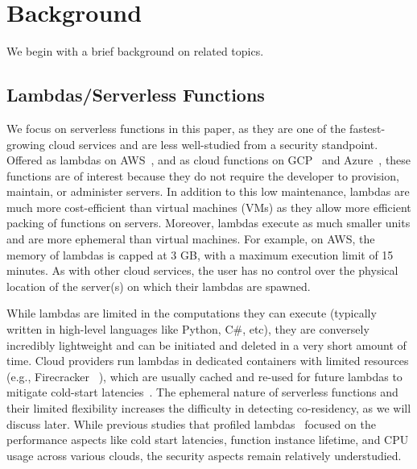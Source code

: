 \section{Background}
\label{sec:background}
We begin with a brief background on related topics.

\subsection{Lambdas/Serverless Functions} 
\label{sec:background:lambdas}

We focus on serverless functions in this paper, as they are one of the
fastest-growing cloud services and are less well-studied from a security
standpoint. Offered as lambdas on AWS~\cite{awslambda}, and as cloud functions
on GCP~\cite{gcpfunctions} and Azure~\cite{azurefunctions}, these functions are
of interest because they do not require the developer to provision, maintain, or
administer servers. In addition to this low maintenance, lambdas are much more
cost-efficient than virtual machines (VMs) as they allow more efficient packing
of functions on servers. Moreover, lambdas execute as much smaller units  and
are more ephemeral than virtual machines.  For example, on AWS,
the memory of lambdas is capped at 3 GB, with a maximum execution limit of 15
minutes.  As with other cloud services, the user has no control over the
physical location of the server(s) on which their lambdas are spawned.

While lambdas are limited in the computations they can execute (typically
written in high-level languages like Python, C\#, etc), they are conversely
incredibly lightweight and can be initiated and deleted in a very short amount
of time. Cloud providers run lambdas in dedicated containers with limited
resources (e.g., Firecracker ~\cite{firecracker}), which are usually cached and
re-used for future lambdas to mitigate cold-start
latencies~\cite{awscontainerreuse}. The ephemeral nature of serverless functions
and their limited flexibility increases the difficulty in detecting
co-residency, as we will discuss later. While previous studies that profiled
lambdas~\cite{wangusenix2018} focused on the performance aspects like cold start
latencies, function instance lifetime, and CPU usage across various clouds,
the security aspects remain relatively understudied.


